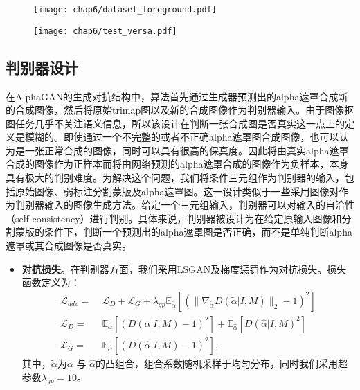 \begin{figure}[t]
	\centering
	\texttt{[image: chap6/dataset\_foreground.pdf]}
	\label{fig6:foreground}
\end{figure}

\begin{figure}[t]
	\centering
	\texttt{[image: chap6/test\_versa.pdf]}
	\label{fig6:test-data}
\end{figure}

\subsection{判别器设计}
在AlphaGAN\cite{lutz2018alphagan}的生成对抗结构中，算法首先通过生成器预测出的alpha遮罩合成新的合成图像，然后将原始trimap图以及新的合成图像作为判别器输入。由于图像抠图任务几乎不关注语义信息，所以该设计在判断一张合成图是否真实这一点上的定义是模糊的。即使通过一个不完整的或者不正确alpha遮罩图合成图像，也可以认为是一张正常合成的图像，同时可以具有很高的保真度。因此将由真实alpha遮罩合成的图像作为正样本而将由网络预测的alpha遮罩合成的图像作为负样本，本身具有极大的判别难度。为解决这个问题，我们将条件三元组作为判别器的输入，包括原始图像、弱标注分割蒙版及alpha遮罩图。这一设计类似于一些采用图像对作为判别器输入的图像生成方法\cite{hu2018pose}。给定一个三元组输入，判别器可以对输入的自洽性（self-consistency）进行判别。具体来说，判别器被设计为在给定原输入图像和分割蒙版的条件下，判断一个预测出的alpha遮罩图是否正确，而不是单纯判断alpha遮罩或其合成图像是否真实。

\begin{itemize}
	\item \textbf{对抗损失}。在判别器方面，我们采用LSGAN\cite{mao2017least}及梯度惩罚\cite{gulrajani2017improved}作为对抗损失。损失函数定义为：
	\begin{equation}
	\begin{aligned}
	\mathcal{L}_{adv} =\; & \mathcal{L}_D + \mathcal{L}_G + \lambda_{gp}  \mathbb{E}_{\tilde{\alpha}}[(\|\nabla_{\tilde{\alpha}}D(\tilde{\alpha}|I, M)\|_2-1)^2]\\
	\mathcal{L}_D =\; & \mathbb{E}_\alpha[(D(\alpha|I, M)-1)^2] + \mathbb{E}_{\hat{\alpha}}[D(\hat{\alpha}|I, M)^2]\\
	\mathcal{L}_G =\; & \mathbb{E}_{\hat{\alpha}}[(D(\hat{\alpha}|I, M)-1)^2],
	\end{aligned}
	\end{equation}
	其中，$ \tilde{\alpha} $为$ \alpha $ 与 $ \hat{\alpha} $的凸组合，组合系数随机采样于均匀分布，同时我们采用超参数$ \lambda_{gp} =10 $。
\end{itemize}

